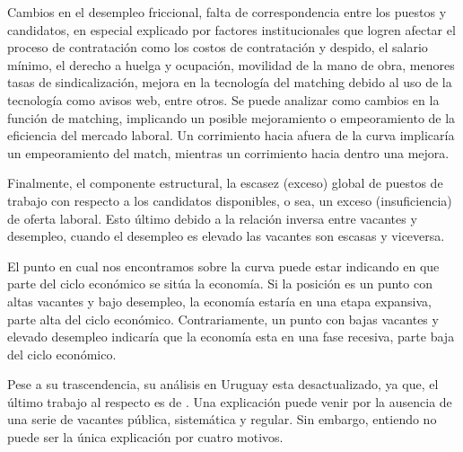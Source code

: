 Cambios en el desempleo friccional, falta de correspondencia entre los puestos y candidatos, en especial explicado por factores institucionales que logren afectar el proceso de contratación como los costos de contratación y despido, el salario mínimo, el derecho a huelga y ocupación, movilidad de la mano de obra, menores tasas de sindicalización, mejora en la tecnología del matching debido al uso de la tecnología como avisos web, entre otros. Se puede analizar como cambios en la función de matching, implicando un posible mejoramiento o empeoramiento de la eficiencia del mercado laboral. Un corrimiento hacia afuera de la curva implicaría un empeoramiento del match, mientras un corrimiento hacia dentro una mejora.

Finalmente, el componente estructural, la escasez (exceso) global de puestos de trabajo con respecto a los candidatos disponibles, o sea, un exceso (insuficiencia) de oferta laboral. Esto último debido a la relación inversa entre vacantes y desempleo, cuando el desempleo es elevado las vacantes son escasas y viceversa.

El punto en cual nos encontramos sobre la curva puede estar indicando en que parte del ciclo económico se sitúa la economía. Si la posición es un punto con altas vacantes y bajo desempleo, la economía estaría en una etapa expansiva, parte alta del ciclo económico. Contrariamente, un punto con bajas vacantes y elevado desempleo indicaría que la economía esta en una fase recesiva, parte baja del ciclo económico.

Pese a su trascendencia, su análisis en Uruguay esta desactualizado, ya que, el último trabajo al respecto es de \cite{Urrestarazu1997}. Una explicación puede venir por la ausencia de una serie de vacantes pública, sistemática y regular. Sin embargo, entiendo no puede ser la única explicación por cuatro motivos.
 
